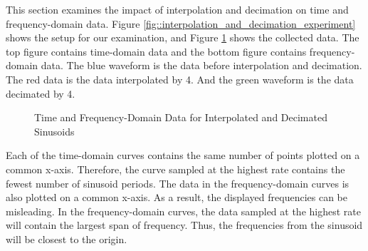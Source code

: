 \documentclass{article}
\begin{document}
This section examines the impact of interpolation and decimation on time and frequency-domain data. Figure \ref{fig::interpolation_and_decimation_experiment} shows the setup for our examination, and Figure \ref{fig::interpolation_and_decimation_waveforms} shows the collected data. The top figure contains time-domain data and the bottom figure contains frequency-domain data. The blue waveform is the data before interpolation and decimation. The red data is the data interpolated by 4. And the green waveform is the data decimated by 4.

\begin{figure}[H]
	\centerline{}
	\caption{Time and Frequency-Domain Data for Interpolated and Decimated Sinusoids}
	\label{fig::interpolation_and_decimation_waveforms}
\end{figure}

Each of the time-domain curves contains the same number of points plotted on a common x-axis. Therefore, the curve sampled at the highest rate contains the fewest number of sinusoid periods. The data in the frequency-domain curves is also plotted on a common x-axis. As a result, the displayed frequencies can be misleading. In the frequency-domain curves, the data sampled at the highest rate will contain the largest span of frequency. Thus, the frequencies from the sinusoid will be closest to the origin.
\end{document}
